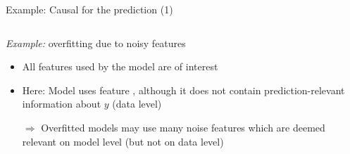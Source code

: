 \documentclass[10pt,compress,t,notes=noshow, xcolor=table]{beamer}
\begin{document}
\begin{frame}{Example: Causal for the prediction (1)}
\begin{columns}[T, totalwidth = \textwidth]
\begin{column}{0.5\linewidth}
  \textit{Example:} overfitting due to noisy features
  \pause
    \begin{itemize}
      \item All features used by the model are of interest
      \item Here: Model uses feature , although it does not contain prediction-relevant information about $y$ (data level)
      \item[$\Rightarrow$] Overfitted models may use many noise features which are deemed relevant on model level (but not on data level)
  \end{itemize}
  \end{column}
\end{columns}

\end{frame}



\end{document}
